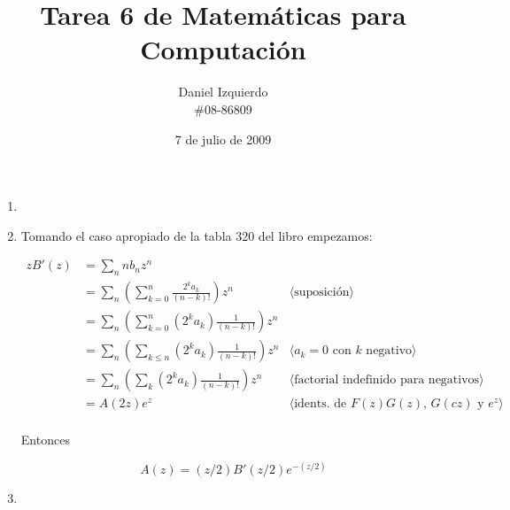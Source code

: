 \documentclass{article}
\begin{document}

\title{Tarea 6 de Matemáticas para Computación}
\author{Daniel Izquierdo \\ \#08-86809}
\date{7 de julio de 2009}

\maketitle

\section{}

\renewcommand{\labelenumi}{(\alph{enumi})}
\begin{enumerate}
 \item
 
 \item Tomando el caso apropiado de la tabla 320 del libro empezamos:

\begin{align*}
zB'(z) & = \sum_n n b_n z^n \\
       & = \sum_n \left( \sum_{k=0}^n \frac{2^k a_k}{(n-k)!} \right) z^n & \langle \text{suposición} \rangle \\
       & = \sum_n \left( \sum_{k=0}^n (2^k a_k) \frac{1}{(n-k)!} \right) z^n \\
       & = \sum_n \left( \sum_{k \leq n} (2^k a_k) \frac{1}{(n-k)!} \right) z^n
           & \langle a_k=0 \text{ con } k \text{ negativo}  \rangle \\
       & = \sum_n \left( \sum_{k} (2^k a_k) \frac{1}{(n-k)!} \right) z^n
           & \langle \text{factorial indefinido para negativos}  \rangle \\
       & = A(2z) e^z & \langle \text{idents. de } F(z)G(z) \text{, } G(cz) \text{ y } e^z \rangle \\
\end{align*}

Entonces

\[
A(z) = (z/2) B'(z/2) e^{-(z/2)}
\]


 \item
\end{enumerate}

\section{}
\end{document}
